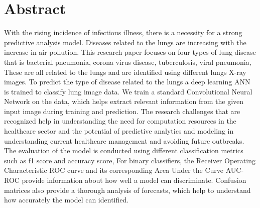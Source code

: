 \chapter*{\center \Large  Abstract}

With the rising incidence of infectious illness, there is a necessity for a strong 
predictive analysis model. Diseases related to the lungs are increasing with the increase in air 
pollution. This research paper focuses on four types of lung disease 
that is bacterial pneumonia, corona virus disease, tuberculosis, viral 
pneumonia, These are all related to the lungs and are identified using different lungs X-ray 
images. To predict the type of 
disease related to the lungs a deep learning ANN is trained to classify lung image data.  We train a standard Convolutional Neural Network on the data, which helps extract relevant information from the given input image during 
training and prediction. The research challenges that are recognized help in understanding the 
need for computation resources in the healthcare sector and the potential of predictive 
analytics and modeling in understanding current healthcare management and avoiding future 
outbreaks. The evaluation of the model is conducted 
using different classification metrics such as f1 score and accuracy score, For binary classifiers, the Receiver Operating Characteristic ROC curve and its corresponding Area Under the Curve AUC-ROC provide information about how well a model can discriminate. Confusion matrices also provide a thorough analysis of forecasts,  which help to 
understand how accurately the model can identified.

